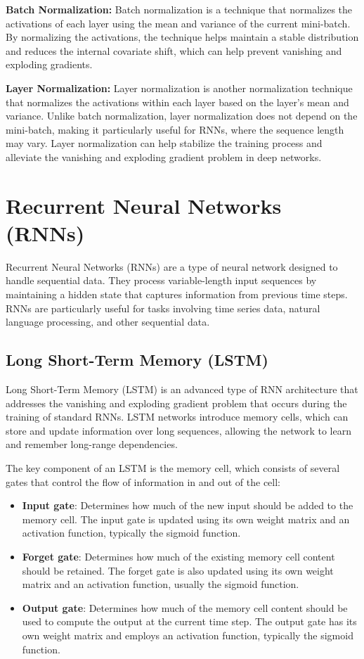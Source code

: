 \documentclass[12pt]{article}
\begin{document}
\textbf{Batch Normalization:} Batch normalization is a technique that normalizes the activations of each layer using the mean and variance of the current mini-batch. By normalizing the activations, the technique helps maintain a stable distribution and reduces the internal covariate shift, which can help prevent vanishing and exploding gradients.

\textbf{Layer Normalization:} Layer normalization is another normalization technique that normalizes the activations within each layer based on the layer's mean and variance. Unlike batch normalization, layer normalization does not depend on the mini-batch, making it particularly useful for RNNs, where the sequence length may vary. Layer normalization can help stabilize the training process and alleviate the vanishing and exploding gradient problem in deep networks.


\section{Recurrent Neural Networks (RNNs)}

Recurrent Neural Networks (RNNs) are a type of neural network designed to handle sequential data. They process variable-length input sequences by maintaining a hidden state that captures information from previous time steps. RNNs are particularly useful for tasks involving time series data, natural language processing, and other sequential data.

\subsection{Long Short-Term Memory (LSTM)}

Long Short-Term Memory (LSTM) is an advanced type of RNN architecture that addresses the vanishing and exploding gradient problem that occurs during the training of standard RNNs. LSTM networks introduce memory cells, which can store and update information over long sequences, allowing the network to learn and remember long-range dependencies.

The key component of an LSTM is the memory cell, which consists of several gates that control the flow of information in and out of the cell:

\begin{itemize}
\item \textbf{Input gate}: Determines how much of the new input should be added to the memory cell. The input gate is updated using its own weight matrix and an activation function, typically the sigmoid function.
\item \textbf{Forget gate}: Determines how much of the existing memory cell content should be retained. The forget gate is also updated using its own weight matrix and an activation function, usually the sigmoid function.
\item \textbf{Output gate}: Determines how much of the memory cell content should be used to compute the output at the current time step. The output gate has its own weight matrix and employs an activation function, typically the sigmoid function.
\end{itemize}
\end{document}
